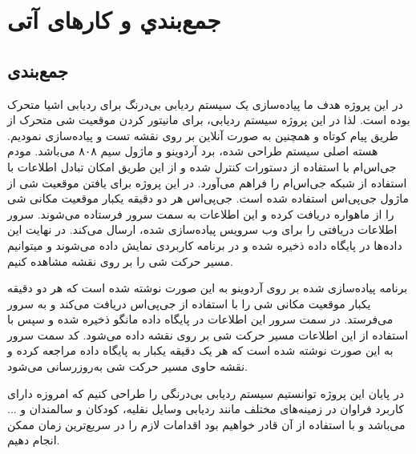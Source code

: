 \chapter{جمع‌بندي و کارهای آتی}
\section{جمع‌بندی}
در این پروژه هدف ما پیاده‌سازی یک سیستم ردیابی بی‌درنگ برای ردیابی اشیا متحرک بوده است.  لذا در این پروژه سیستم ردیابی، برای مانیتور کردن موقعیت شی متحرک از طریق پیام کوتاه و همچنین به صورت آنلاین بر روی نقشه تست و پیاده‌سازی نمودیم. هسته اصلی سیستم طراحی شده، برد آردوینو و ماژول سیم ۸۰۸ می‌باشد. مودم جی‌اس‌ام با استفاده از دستورات  کنترل شده و از این طریق امکان تبادل اطلاعات با استفاده از شبکه جی‌اس‌ام را فراهم می‌آورد. در این پروژه برای یافتن موقعیت شی از ماژول جی‌پی‌اس استفاده شده است. جی‌پی‌اس هر دو دقیقه یکبار موقعیت مکانی شی را از ماهواره دریافت کرده و این اطلاعات به سمت سرور فرستاده می‌شوند. سرور اطلاعات دریافتی را برای وب سرویس پیاده‌سازی شده، ارسال می‌کند. در نهایت این داده‌ها در پایگاه داده ذخیره شده و در برنامه کاربردی نمایش داده می‌شوند و میتوانیم مسیر حرکت شی را بر روی نقشه مشاهده کنیم.


برنامه پیاده‌سازی شده بر روی آردوینو به این صورت نوشته شده است که هر دو دقیقه یکبار موقعیت مکانی شی را با استفاده از جی‌پی‌اس دریافت می‌کند و به سرور می‌فرستد. در سمت سرور  این اطلاعات در پایگاه داده مانگو ذخیره شده و سپس با استفاده از این اطلاعات مسیر حرکت شی بر روی نقشه داده می‌شود. کد سمت سرور به این صورت نوشته شده است که هر یک دقیقه یکبار به پایگاه داده مراجعه کرده و نقشه حاوی مسیر حرکت شی به‌روزرسانی می‌شود.


در پایان این پروژه توانستیم سیستم ردیابی بی‌درنگی را  طراحی کنیم که امروزه دارای کاربرد فراوان در زمینه‌های مختلف مانند ردیابی وسایل نقلیه، کودکان و سالمندان و ... می‌باشد و با استفاده از آن قادر خواهیم بود اقدامات لازم را در سریع‌ترین زمان ممکن انجام دهیم.